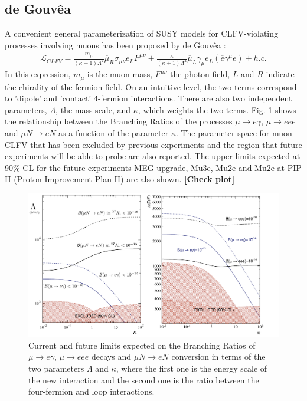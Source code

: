 \documentclass[12pt,a4paper,openright, oneside, titlepage]{book} %
\begin{document}
\subsection{de Gouv\^{e}a}
A convenient general parameterization of SUSY models for CLFV-violating processes involving muons has been proposed by de Gouv\^{e}a \cite{deGouvea}:
\begin{align}
\mathcal{L}_{CLFV}=
\frac{m_\mu}{(\kappa+1)\Lambda^2}\overline{\mu}_R\sigma_{\mu\nu}e_LF^{\mu\nu}+
\frac{\kappa}{(\kappa+1)\Lambda^2}\overline{\mu}_L\gamma_\mu e_L (\overline{e}\gamma^\mu e)+h.c.
\label{eq_deGouvea}
\end{align}
In this expression, $m_\mu$ is the muon mass, $F^{\mu\nu}$ the photon field, 
$L$ and $R$ indicate the chirality of the fermion field.
On an intuitive level, 
the two terms correspond to 'dipole' and 'contact' 4-fermion interactions.
There are also two independent parameters,  $\Lambda$, the mass scale, and $\kappa$, 
which weights the two terms. 
Fig. \ref{_deGouvea} shows the relationship between 
the Branching Ratios of the processes $\mu\rightarrow e\gamma$, $\mu\rightarrow eee$ 
and $\mu N \rightarrow e N$ as a function of the parameter $\kappa$. 
The parameter space for muon CLFV that has been excluded by previous experiments 
and the region that future experiments will be able to probe are also reported. 
The upper limits expected at 90\% CL for the future experiments MEG upgrade, 
Mu3e, Mu2e and Mu2e at PIP II (Proton Improvement Plan-II) are also shown. \textbf{[Check plot]}

\begin{figure}[h!]
\includegraphics[scale=0.8]{deGouvea}
\caption[Limits on the BR]{Current and future limits expected on the Branching Ratios of 
$\mu\rightarrow e\gamma$,
$\mu\rightarrow eee$ decays and $\mu N \rightarrow e N$ conversion in terms 
of the two parameters $\Lambda$ and $\kappa$, where the first one is 
the energy scale of the new interaction and the second one is the ratio
between the four-fermion and loop interactions.}
\label{_deGouvea}
\end{figure}
\end{document}
